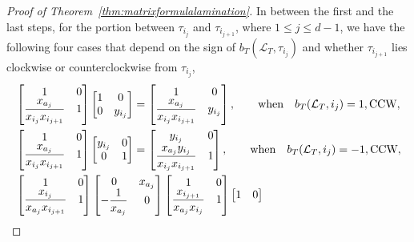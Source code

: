 \documentclass[10pt,a4paper]{amsart}
\numberwithin{equation}{section}
\theoremstyle{definition}
\begin{document}
\begin{proof}[Proof of Theorem~\ref{thm:matrixformulalamination}]
In between the first and the last steps, for the portion between $\tau_{i_j}$ and $\tau_{i_{j+1}}$, where $1\leq j\leq d-1$, we have the following four cases that depend on the sign of $b_T(\mathcal{L}_T, \tau_{i_j})$ and whether $\tau_{i_{j+1}}$ lies clockwise or counterclockwise from $\tau_{i_j}$,{\samepage
\begin{gather*}
\begin{split}
 &\begin{bmatrix}
 1 & 0\\
 \dfrac{x_{a_j}}{x_{i_j}x_{i_{j+1}}} & 1
 \end{bmatrix}
 \begin{bmatrix}
 1 & 0\\
 0 & y_{i_j}
 \end{bmatrix}=
 \begin{bmatrix}
 1 & 0\\
 \dfrac{x_{a_j}}{x_{i_j}x_{i_{j+1}}} & y_{i_j}
 \end{bmatrix} , \qquad\text{when}\quad b_T(\mathcal{L}_T, i_j)=1, \text{CCW},\\
& \begin{bmatrix}
 1 & 0\\
 \dfrac{x_{a_j}}{x_{i_j}x_{i_{j+1}}} & 1
 \end{bmatrix}
 \begin{bmatrix}
 y_{i_j} & 0\\
 0 & 1
 \end{bmatrix}=
 \begin{bmatrix}
 y_{i_j} & 0\vspace{1mm}\\
 \dfrac{x_{a_j}y_{i_j}}{x_{i_j}x_{i_{j+1}}} & 1
 \end{bmatrix}, \qquad\text{when}\quad b_T(\mathcal{L}_T, i_j)=-1, \text{CCW},\\
& \begin{bmatrix}
 1 & 0\\
 \dfrac{x_{i_j}}{x_{a_j}x_{i_{j+1}}} & 1\\
 \end{bmatrix}
 \begin{bmatrix}
 0 & x_{a_j}\\
 -\dfrac{1}{x_{a_j}} & 0
 \end{bmatrix}
 \begin{bmatrix}
 1 & 0\\
 \dfrac{x_{i_{j+1}}}{x_{a_j}x_{i_j}} & 1
 \end{bmatrix}
 \begin{bmatrix}
 1 & 0\\

\end{bmatrix}
\end{split}
\end{gather*}}
\end{proof}
\end{document}
